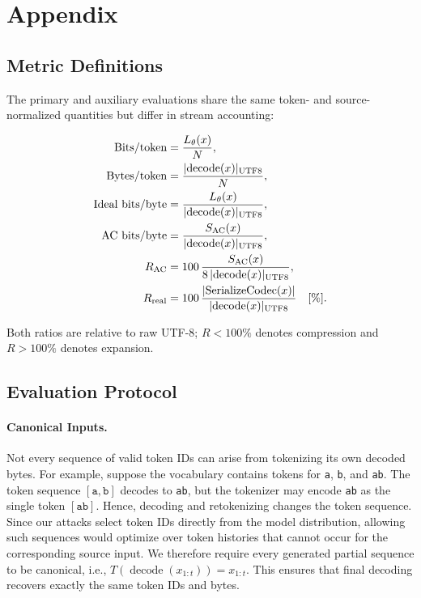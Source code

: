 \section{Appendix}

\subsection{Metric Definitions}
The primary and auxiliary evaluations share the same token- and source-normalized quantities but differ in stream accounting:

\begin{align}
  \text{Bits/token} &= \frac{L_\theta(x)}{N},\\
  \text{Bytes/token} &= \frac{\lvert \operatorname{decode}(x)\rvert_{\mathrm{UTF8}}}{N},\\
  \text{Ideal bits/byte} &= \frac{L_\theta(x)}
    {\lvert \operatorname{decode}(x)\rvert_{\mathrm{UTF8}}},\\
  \text{AC bits/byte} &= \frac{S_{\mathrm{AC}}(x)}
    {\lvert \operatorname{decode}(x)\rvert_{\mathrm{UTF8}}},\\
  R_{\mathrm{AC}} &= 100\,\frac{S_{\mathrm{AC}}(x)}
    {8\,\lvert \operatorname{decode}(x)\rvert_{\mathrm{UTF8}}},\\
  R_{\mathrm{real}} &= 100\,\frac{\left|\operatorname{SerializeCodec}(x)\right|}
    {\lvert \operatorname{decode}(x)\rvert_{\mathrm{UTF8}}} \quad [\%].
\end{align}

Both ratios are relative to raw UTF-8; $R<100\%$ denotes compression and $R>100\%$ denotes expansion.

\subsection{Evaluation Protocol}
\label{app:experimental-details}

\paragraph{Canonical Inputs.}
\label{app:canonicality}
Not every sequence of valid token IDs can arise from tokenizing its own decoded
bytes. For example, suppose the vocabulary contains tokens for
\texttt{a}, \texttt{b}, and \texttt{ab}. The token sequence
$[\texttt{a},\texttt{b}]$ decodes to \texttt{ab}, but the tokenizer may encode
\texttt{ab} as the single token $[\texttt{ab}]$. Hence, decoding and
retokenizing changes the token sequence. Since our attacks select token IDs
directly from the model distribution, allowing such sequences would optimize
over token histories that cannot occur for the corresponding source input.
We therefore require every generated partial sequence to be canonical, i.e.,
$T(\operatorname{decode}(x_{1:t}))=x_{1:t}$. This ensures that final decoding
recovers exactly the same token IDs and bytes.

